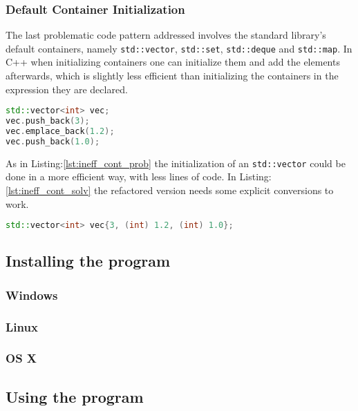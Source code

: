 \subsubsection{Default Container Initialization}
\par The last problematic code pattern addressed involves the standard library's default containers, namely \verb|std::vector|, \verb|std::set|, \verb|std::deque| and \verb|std::map|. In C++ when initializing containers one can initialize them and add the elements afterwards, which is slightly less efficient than initializing the containers in the expression they are declared.
\begin{lstlisting}[language=c++, frame=single ,caption={Inefficient way of creating containers}, label={lst:ineff_cont_prob}]
std::vector<int> vec;
vec.push_back(3);
vec.emplace_back(1.2);
vec.push_back(1.0);
\end{lstlisting}
\par As in Listing:\ref{lst:ineff_cont_prob} the initialization of an \verb|std::vector| could be done in a more efficient way, with less lines of code. In Listing:\ref{lst:ineff_cont_solv}  the refactored version needs some explicit conversions to work. 
\begin{lstlisting}[language=c++, frame=single ,caption={A faster way of initializing}, label={lst:ineff_cont_solv}]
std::vector<int> vec{3, (int) 1.2, (int) 1.0};
\end{lstlisting}
\subsection{Installing the program}
\subsubsection{Windows}
\subsubsection{Linux}
\subsubsection{OS X}
\subsection{Using the program}